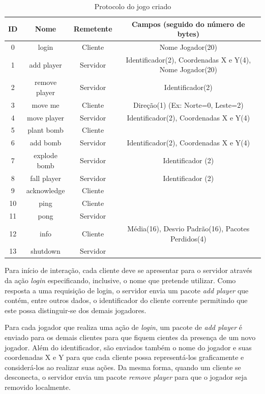 \documentclass[12pt]{article}
\begin{document}
\begin{table}
  \center
  \footnotesize
  \begin{tabular}{|c|c|c|c|}
  \hline
    \textbf{ID} & \textbf{Nome} & \textbf{Remetente} & \textbf{Campos (seguido do número de bytes)} \\ \hline
    0 & login & Cliente & Nome Jogador(20)  \\ \hline
    1 & add player & Servidor & Identificador(2), Coordenadas X e Y(4), Nome Jogador(20)\\ \hline
    2 & remove player & Servidor & Identificador(2) \\ \hline
    3 & move me & Cliente & Direção(1) (Ex: Norte=0, Leste=2) \\ \hline
    4 & move player & Servidor & Identificador(2), Coordenadas X e Y(4) \\ \hline
    5 & plant bomb & Cliente & \\ \hline
    6 & add bomb & Servidor &  Identificador(2), Coordenadas X e Y(4)  \\ \hline
    7 & explode bomb & Servidor & Identificador (2) \\ \hline
    8 & fall player & Servidor & Identificador (2) \\ \hline
    9 & acknowledge & Cliente & \\ \hline
   10 & ping & Cliente & \\ \hline
   11 & pong & Servidor & \\ \hline
   12 & info & Cliente & Média(16), Desvio Padrão(16), Pacotes Perdidos(4)  \\ \hline
   13 & shutdown & Servidor &\\ \hline
  \end{tabular} 
\caption{Protocolo do jogo criado}
\label{tab:protocolo}
\end{table} 

Para início de interação, cada cliente deve se apresentar para o servidor
através da ação \emph{login} especificando, inclusive, o nome que pretende
utilizar. Como resposta a uma requisição de login, o servidor envia um pacote
\emph{add player} que contém, entre outros dados, o identificador do cliente
corrente permitindo que este possa distinguir-se dos demais jogadores.

Para cada jogador que realiza uma ação de \emph{login}, um pacote de \emph{add player} é enviado para
os demais clientes para que fiquem cientes da presença de um novo jogador. Além
do identificador, são enviados também o nome do jogador e suas coordenadas X e
Y para que cada cliente possa representá-los graficamente e considerá-los ao
realizar suas ações. Da mesma forma, quando um cliente se desconecta, o
servidor envia um pacote \emph{remove player} para que o jogador seja removido localmente.
\end{document}
